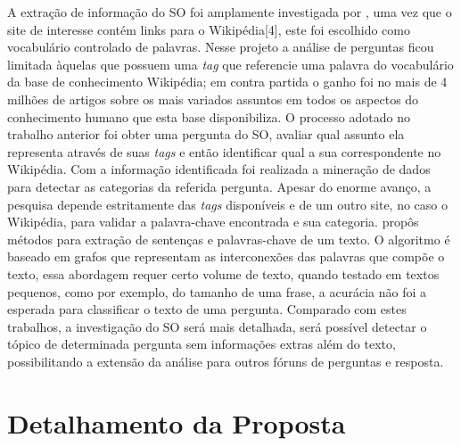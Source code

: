 \documentclass[10pt,a4paper,final]{article}
\begin{document}
A extração de informação do SO foi amplamente investigada por \cite{Arash2016}, uma vez que o site de interesse contém links para o Wikipédia[4], este foi escolhido como vocabulário controlado de palavras. Nesse projeto a análise de perguntas ficou limitada àquelas que possuem uma \textit{tag} que referencie uma palavra do vocabulário da base de conhecimento Wikipédia; em contra partida o ganho foi no mais de 4 milhões de artigos sobre os mais variados assuntos em todos os aspectos do conhecimento humano que esta base disponibiliza.
\newline
\newline
O processo adotado no trabalho anterior foi obter uma pergunta do SO, avaliar qual assunto ela representa através de suas \textit{tags} e então identificar qual a sua correspondente no Wikipédia. Com a informação identificada foi realizada a mineração de dados para detectar as categorias da referida pergunta. 
\newline
\newline
Apesar do enorme avanço, a pesquisa depende estritamente das \textit{tags} disponíveis e de um outro site, no caso o Wikipédia, para validar a palavra-chave encontrada e sua categoria. \cite{Mihalcea2004} propôs métodos para extração de sentenças e palavras-chave de um texto. O algoritmo é baseado em grafos que representam as interconexões das palavras que compõe o texto, essa abordagem requer certo volume de texto, quando testado em textos pequenos, como por exemplo, do tamanho de uma frase, a acurácia não foi a esperada para classificar o texto de uma pergunta.
 \newline
 \newline
Comparado com estes trabalhos, a investigação do SO será mais detalhada, será possível detectar o tópico de determinada pergunta sem informações extras além do texto, possibilitando a extensão da análise para outros fóruns de perguntas e resposta.
 

 \section{Detalhamento da Proposta}
\end{document}
